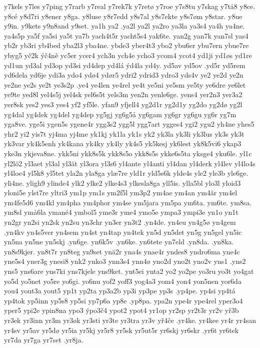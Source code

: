 {{y7kels
y7les
y7ping
y7rarb
y7real
y7rek7k
y7retø
y7roe
y7s8tu
y7skag
y7tå8
y8ce.
y8cé
y8d7ri
y8ener
y8ga.
y8luse
y8r7edd
y8s7al
y8s7ekte
y8s7øm
y8star.
y8ue
y9in.
y9kets
y9n8and
y9set.
ya1h
ya2
.ya2l
ya2l
ya2ro
ya3la
ya3s4
ya4h
ya4ne.
ya4s5p
ya5f
ya5si
ya5t
ya7b
yach4t5r
yacht5s4
yak6te.
yan2g
yan7k
yan7sl
yas4
yb2r
yb3ri
yb4bed
yba2l3
yba4ne.
ybde3
yber4t3
ybo2
ybu6er
ybu7ern
ybue7re
ybyg5
yč2k
ýč4ně
yc5er
ycer4
ych3n
ych4e
ycho3
ycom4
ycot4
yd1ji
yd1øs
yd1re
yd1un
yd3al
yd3op
yd3si
yd4dep
yd4lá
ýd4la
yd4y.
yd5av
yd5ov
.yd5r
yd5rem
yd6dela
yd6je
ydi3a
ydo4
ydø4
ydør5
ydri2
ydrid3
ydro3
yds4v
ye2
ye2d
ye2n
ye2ne
ye2s
ye2t
ye3s2p
.ye4
ye4len
ye4rel
ye4t
ye5ni
ye5sm
ye5ty
ye6dre
ye6let
ye9te
yed8l
yel4s5j
yel4sk
yel6s5t
yels3m
yen2n
yenle6ge.
yens4
yer2n3
yer3a2
yer8sk
yes2
yes3
yes4
yf2
yf5le.
yfan9
yfjell4
yg2d1r
yg2d1y
yg2do
yg2dø
yg2l
yg4dal
yg4dek
yg4del
yg4dep
yg5gj
yg6g5å
yg6gam
yg6gr
yg6gu
yg6r
yg7m
yga8ve.
yge5i
ygen5s
ygene4r
ygg3s2
ygg5l
ygg7art
ygges4
ygi2
ygu2
yh4ne
yhes5
yhr2
yi2
yis7t
yj4ma
yj4me
yk1kj
yk1la
yk1s
yk2
yk3la
yk3li
yk3lus
yk3s
yk3t
yk3var
yk4k5enh
yk4kana
yk4ky
yk4ly
yk4s5
yk5kesj
yk6lest
yk8k5vi6
ykap3
yke3n
ykjeva8ne.
ykk5ni
ykk8s5k
ykk8s5o
ykk8s5s
ykke6s5ta
yksge4
yku6le.
yl1c
yl2lö2
yl3aet
yl3al
yl3ät
yl3ora
yl3s6
yl4ante
yl4anti
yl4dan
yl4derk
yl4lev
yl4lo4s
yl4loe4
yl5k8
yl5tet
yla2n
yla8ga
ylæ7re
yld1r
yld5s6k
ylde4s
yle2
yle3b
yle6ge.
yli4ne.
yligh9
ylinde4
ylk2
ylke2
ylke4s3
ylkesla8ga
yll5is.
ylla5bl
ylo3l
yloid3
yloni5e
ylst7re
yltri3
ym1p
ym1s
ym2f5l
ym3p2
ym4ae
ym4an
ym4är
ym4el
ym4fe5d6
ym4kl
ym4pha
ym4phor
ym4se
ym5jara
ym5pa
ym6ta.
ym6te.
ym8sa.
ym8sl
ymå6la
ymané4
ymbol5
yme3r
yme4
ymo5e
ympa3
ympi3e
yn1o
yn1t
yn2gr
yn2si
yn2sk
yn2su
yn3chr
yn3er
yn3t2
.yn4de.
yn4eu
yn4g5ø
yn4gem
.yn4kv
yn4s5ver
yn4sem
yn4st
yn4tap
yn4tek
yn5d
yn5det
yn5g
yn5gel
yn5ic
yn5na
yn5ne
yn5skj
.yn6ge.
yn6k5v
.yn6ke.
yn6tete
yn7eld
.yn8da.
.yn8ka.
yn8s9kjer.
yn8t7r
yn8teg
yn9set
ynä2r
yna4s
ynae4r
yndes8
yndro6ma
yne4c
yne5s4
yner3g
ynesi8
ynk2
ynko3
ynn3s4
ynn4ø
yno2d
yno2t
yno2v
yns1
.yns2
yns5
yns6are
yns7ki
yns7kjele
yns9ket.
ynt5ei
ynta2
yo2
yo2pe
yo3ru
yo3t
yo4gat
yo5d
yo5net
yo5re
yo6gi.
yo6nu
yof2
yoff3
yog4a3
yom4
yon4
yon5nen
yor6da
you4
yout3a
yout5
yp1t
yp2ta
yp3a2b
yp3i
yp3pe
yp3s
.yp4pe.
yp4si
yp4tá
yp4tok
yp5inn
yp5s8
yp5si
yp7p6a
yp8e
.yp8pa.
ypa2n
ype4r
ype4rel
yper3o4
yper5
ypi2e
ypin8na
ypo3
ýpo3č4
ypot2
ypot4
yr1op
yr2sp
yr2t3r
yr2v
yř3b
yr3ek
yr3inn
yr3m
yr3øk
yr3sti
yr3te
yr3tra
yr3v
yř4če
.yr4ke.
yr4kee
yr4r
yr4san
yr4sv
yr5av
yr5dø
yr5ia
yr5kj
yr5r8
yr5sk
yr5ut5r
yr6skj
yr6skr
.yr6t
yr6tek
yr7da
yr7ga
yr7set
.yr8ja.
}}
